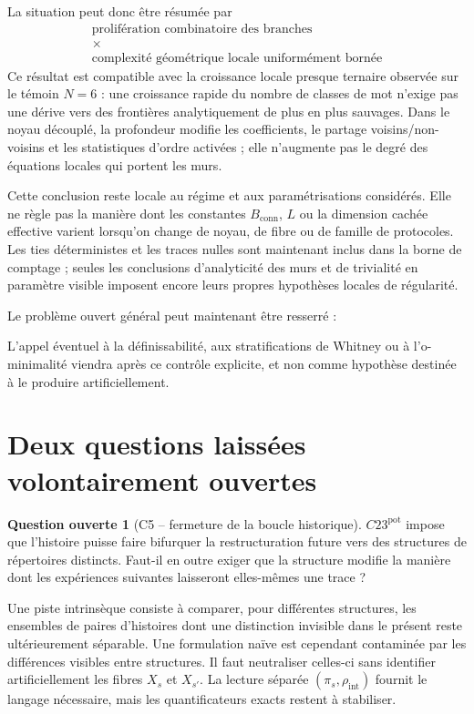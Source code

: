 \documentclass[11pt,a4paper]{article}
\theoremstyle{definition}
\newtheorem{question}[definition]{Question ouverte}
\theoremstyle{remark}
\begin{document}
La situation peut donc être résumée par
\[
\boxed{
\begin{gathered}
\text{prolifération combinatoire des branches}\\[-0.15em]
\times\\[-0.15em]
\text{complexité géométrique locale uniformément bornée}
\end{gathered}}
\]
Ce résultat est compatible avec la croissance locale presque ternaire observée sur le témoin $N=6$ : une croissance rapide du nombre de classes de mot n'exige pas une dérive vers des frontières analytiquement de plus en plus sauvages. Dans le noyau découplé, la profondeur modifie les coefficients, le partage voisins/non-voisins et les statistiques d'ordre activées ; elle n'augmente pas le degré des équations locales qui portent les murs.

Cette conclusion reste locale au régime et aux paramétrisations considérés. Elle ne règle pas la manière dont les constantes $B_{\mathrm{conn}}$, $L$ ou la dimension cachée effective varient lorsqu'on change de noyau, de fibre ou de famille de protocoles. Les ties déterministes et les traces nulles sont maintenant inclus dans la borne de comptage ; seules les conclusions d'analyticité des murs et de trivialité en paramètre visible imposent encore leurs propres hypothèses locales de régularité.

Le problème ouvert général peut maintenant être resserré :
\begin{center}
\end{center}

L'appel éventuel à la définissabilité, aux stratifications de Whitney ou à l'o-minimalité viendra après ce contrôle explicite, et non comme hypothèse destinée à le produire artificiellement.

\section{Deux questions laissées volontairement ouvertes}

\begin{question}[C5 -- fermeture de la boucle historique]
$C23^{\mathrm{pot}}$ impose que l'histoire puisse faire bifurquer la restructuration future vers des structures de répertoires distincts. Faut-il en outre exiger que la structure modifie la manière dont les expériences suivantes laisseront elles-mêmes une trace ?

Une piste intrinsèque consiste à comparer, pour différentes structures, les ensembles de paires d'histoires dont une distinction invisible dans le présent reste ultérieurement séparable. Une formulation naïve est cependant contaminée par les différences visibles entre structures. Il faut neutraliser celles-ci sans identifier artificiellement les fibres $X_s$ et $X_{s'}$. La lecture séparée $(\pi_s,\rho_{\mathrm{int}})$ fournit le langage nécessaire, mais les quantificateurs exacts restent à stabiliser.
\end{question}
\end{document}
